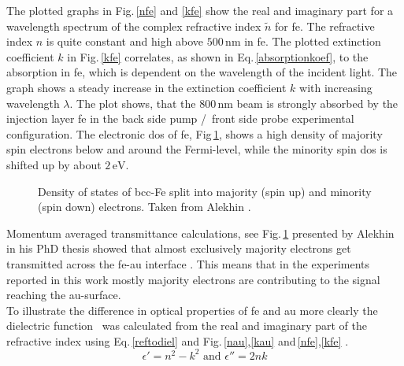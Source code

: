 \documentclass[a4paper,12pt,twoside]{article}
\begin{document}
\noindent
The plotted graphs in Fig.\,\ref{nfe} and \ref{kfe} show the real and imaginary part for a wavelength spectrum of the complex refractive index $\tilde{n}$ for \gls{fe}. The refractive index $n$ is quite constant and high above $500\,\mathrm{nm}$ in \gls{fe}. The plotted extinction coefficient $k$ in Fig.\,\ref{kfe} correlates, as shown in Eq.\,\ref{absorptionkoef}, to the absorption in \gls{fe}, which is dependent on the wavelength of the incident light. The graph shows a steady increase in the extinction coefficient $k$ with increasing wavelength $\lambda$. The plot shows, that the $800\,\mathrm{nm}$ beam is strongly absorbed by the injection layer \gls{fe} in the back side pump /\, front side probe experimental configuration. 
The electronic \gls{dos} of \gls{fe}, Fig\,\ref{DOSiron}, shows a high density of majority spin electrons below and around the Fermi-level, while the minority spin \gls{dos} is shifted up by about $2\,\mathrm{eV}$.
    \begin{figure}[H]
		\caption{Density of states of bcc-Fe split into majority (spin up) and minority (spin down) electrons. Taken from Alekhin \cite{Alekhin2015}.}
		    \label{DOSiron}
	\end{figure}
\noindent Momentum averaged transmittance calculations, see Fig.\,\ref{DOSiron} presented by Alekhin in his PhD thesis showed that almost exclusively majority electrons get transmitted across the \gls{fe}-\gls{au} interface \cite{Alekhin2015}. This means that in the experiments reported in this work mostly majority electrons are contributing to the signal reaching the \gls{au}-surface.\\
To illustrate the difference in optical properties of \gls{fe} and \gls{au} more clearly the dielectric function \textepsilon\, was calculated from the real and imaginary part of the refractive index using Eq.\,\ref{reftodiel} and Fig.\,\ref{nau},\ref{kau} and\,\ref{nfe},\ref{kfe} \cite{Alekhin2015}.
\begin{equation}
\label{reftodiel}
\epsilon' = n^2 - k^2\,\, \mathrm{and}\,\, \epsilon'' = 2nk
\end{equation}
\end{document}
